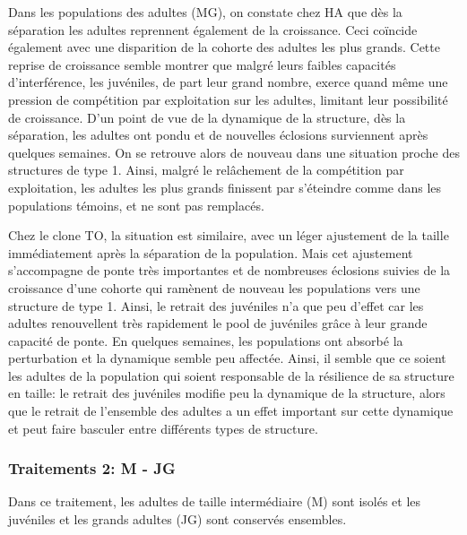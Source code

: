 Dans les populations des adultes (MG), on constate chez HA que dès la
séparation les adultes reprennent également de la croissance. Ceci coïncide
également avec une disparition de la cohorte des adultes les plus grands. Cette
reprise de croissance semble montrer que malgré leurs faibles capacités
d'interférence, les juvéniles, de part leur grand nombre, exerce quand même une
pression de compétition par exploitation sur les adultes, limitant leur
possibilité de croissance. D'un point de vue de la dynamique de la structure,
dès la séparation, les adultes ont pondu et de nouvelles éclosions surviennent
après quelques semaines. On se retrouve alors de nouveau dans une situation
proche des structures de type 1. Ainsi, malgré le relâchement de la compétition
par exploitation, les adultes les plus grands finissent par s'éteindre comme
dans les populations témoins, et ne sont pas remplacés. 

Chez le clone TO, la situation est similaire, avec un léger ajustement de la
taille immédiatement après la séparation de la population. Mais cet ajustement
s'accompagne de ponte très importantes et de nombreuses éclosions suivies de
la croissance d'une cohorte qui ramènent de nouveau les populations vers une
structure de type 1.
Ainsi, le retrait des juvéniles n'a que peu d'effet car les adultes renouvellent très rapidement le
pool de juvéniles grâce à leur grande capacité de ponte. En quelques semaines,
les populations ont absorbé la perturbation et la dynamique semble peu affectée.
Ainsi, il semble que ce soient les adultes de la population qui soient
responsable de la résilience de sa structure en taille: le retrait des juvéniles
modifie peu la dynamique de la structure, alors que le retrait de l'ensemble des
adultes a un effet important sur cette dynamique et peut faire basculer entre
différents types de structure. 

\subsubsection{Traitements 2: M - JG}

Dans ce traitement, les adultes de taille intermédiaire (M) sont isolés et les
juvéniles et les grands adultes (JG) sont conservés ensembles.

